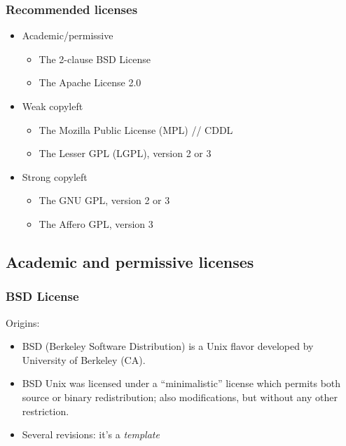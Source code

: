 
\begin{frame}
\frametitle{Recommended licenses}

\begin{itemize}
\item	Academic/permissive
	\begin{itemize}
	\item The 2-clause BSD License 
	\item The Apache License 2.0 
	\end{itemize}
\item Weak copyleft
	\begin{itemize}
	\item The Mozilla Public License (MPL) // CDDL
	\item The Lesser GPL (LGPL), version 2 or 3
	\end{itemize}
\item Strong copyleft
	\begin{itemize}
	\item The GNU GPL, version 2 or 3 
	\item The Affero GPL, version 3
	\end{itemize}
\end{itemize}

\end{frame}


\subsection{Academic and permissive licenses}

\begin{frame}
\frametitle{BSD License}

Origins:
\begin{itemize}
\item BSD (Berkeley Software Distribution) is a Unix flavor developed
  by University of Berkeley (CA).
\item BSD Unix was licensed under a ``minimalistic'' license which
  permits both source or binary redistribution; also modifications,
  but without any other restriction.
\item Several revisions: it's a \textit{template}
\end{itemize}

\end{frame}


